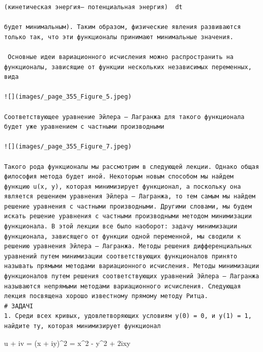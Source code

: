 \documentclass[
  ukrainian,
]{article}
\begin{document}
\begin{verbatim}
(кинетическая энергия— потенциальная энергия)  dt 

будет минимальным). Таким образом, физические явления развиваются только так, что эти функционалы принимают минимальные значения.

 Основные идеи вариационного исчисления можно распространить на функционалы, зависящие от функции нескольких независимых переменных, вида

![](images/_page_355_Figure_5.jpeg)

Соответствующее уравнение Эйлера — Лагранжа для такого функционала будет уже уравнением с частными производными

![](images/_page_355_Figure_7.jpeg)

Такого рода функционалы мы рассмотрим в следующей лекции. Однако общая философия метода будет иной. Некоторым новым способом мы найдем функцию u(x, y), которая минимизирует функционал, а поскольку она является решением уравнения Эйлера — Лагранжа, то тем самым мы найдем решение уравнения с частными производными. Другими словами, мы будем искать решение уравнения с частными производными методом минимизации функционала. В этой лекции все было наоборот: задачу минимизации функционала, зависящего от функции одной переменной, мы сводили к решению уравнения Эйлера — Лагранжа. Методы решения дифференциальных уравнений путем минимизации соответствующих функционалов принято называть прямыми методами вариационного исчисления. Методы минимизации функционалов путем решения соответствующих уравнений Эйлера — Лагранжа называются непрямыми методами вариационного исчисления. Следующая лекция посвящена хорошо известному прямому методу Ритца.
# ЗАДАЧІ
1. Среди всех кривых, удовлетворяющих условиям y(0) = 0, и y(1) = 1, найдите ту, которая минимизирует функционал
\end{verbatim}

u + iv = (x + iy)\^{}2 = x\^{}2 - y\^{}2 + 2ixy
\end{document}
